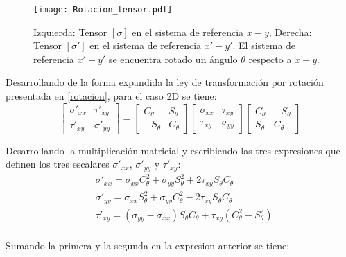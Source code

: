 \documentclass[../notas medios.tex]{subfiles}
\begin{document}
\begin{figure}[H]
\centering
\texttt{[image: Rotacion\_tensor.pdf]}
\caption{Izquierda: Tensor $[\sigma]$ en el sistema de referencia $x-y$, Derecha: Tensor $[\sigma ']$ en el sistema de referencia $x'-y'$. El sistema de referencia $x'-y'$ se encuentra rotado un ángulo $\theta$ respecto a $x-y$.} 
\label{rota2D}
\end{figure} 
%
Desarrollando de la forma expandida la  ley de transformación por rotación presentada en \cref{rotacion}, para el caso 2D se tiene: \\
%
\begin{equation}
\left[ 
\begin{array}{ccc}
\sigma '_{xx} & \tau '_{xy} \\
\tau '_{xy} & \sigma '_{yy}
\end{array}
\right] =
\left[ 
\begin{array}{ccc}
C_\theta & S_\theta \\
-S_\theta & C_\theta
\end{array}
\right]
\left[ 
\begin{array}{ccc}
\sigma_{xx} & \tau_{xy} \\
\tau_{xy} & \sigma_{yy}
\end{array}
\right]
\left[ 
\begin{array}{ccc}
C_\theta & -S_\theta \\
S_\theta & C_\theta
\end{array}
\right]
\label{trans2d}
\end{equation}

Desarrollando la multiplicación matricial y escribiendo las tres expresiones que definen los tres escalares $\sigma ' _{xx}$, $\sigma ' _{yy}$ y $\tau ' _{xy}$:\\

\begin{equation}
\begin{aligned}
&\sigma ' _{xx} = \sigma _{xx} C^2 _\theta + \sigma _{yy} S^2 _\theta + 2 \tau _{xy} S _\theta C _\theta \\
&\sigma ' _{yy} = \sigma _{xx} S^2 _\theta + \sigma _{yy} C^2 _\theta - 2 \tau _{xy} S _\theta C _\theta \\
&\tau ' _{xy} = (\sigma _{yy} - \sigma _{xx}) S_\theta C _\theta +  \tau _{xy} (C^2 _\theta - S^2 _\theta) \\
\end{aligned}
\label{trans}
\end{equation}
%

Sumando la primera y la  segunda en la expresion anterior se tiene:
\end{document}
